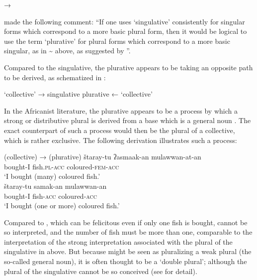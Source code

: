 \begin{exe}
  \ex\label{ex:fassi:17}  → 
\end{exe}

\citet[17, fn. 11]{Corbett2000} made the following comment: ``If one uses
`singulative' consistently for singular forms which correspond to a more basic
plural form, then it would be logical to use the term `plurative' for plural
forms which correspond to a more basic singular, as in 
\textasciitilde\xspace {} above, as suggested by
\citet[224]{Dimmendaal1983}''.

Compared to the singulative, the plurative appears to be taking an opposite
path to be derived, as schematized in :

\begin{exe}
  \ex\label{ex:fassi:18}
  \begin{xlist}
    \ex\label{ex:fassi:18a} `collective' → singulative
    \ex\label{ex:fassi:18b} plurative ← `collective'
  \end{xlist}
\end{exe}

In the Africanist literature, the plurative appears to be a process by which a
strong or distributive plural is derived from a base which is a general noun
\citep[see][]{Mous2008}. The exact  counterpart of such a process would
then be the plural of a collective, which is rather exclusive. The following
derivation illustrates such a process:

\begin{exe}
  \ex\label{ex:fassi:19}
  \begin{xlist}
    \ex\label{ex:fassi:19a}   (collective) →   (plurative)
    \ex\label{ex:fassi:19b}
    \gll \v{s}taray-tu ʔasmaak-an mulawwan-at-an\\
    bought-I fish.\textsc{pl-acc} coloured-\textsc{fem-acc}\\
    \glt `I bought (many) coloured fish.'\\
    \ex\label{ex:fassi:19c}
    \gll \v{s}taray-tu samak-an mulawwan-an\\
    bought-I fish-\textsc{acc} coloured-\textsc{acc}\\
    \glt `I bought (one or more) coloured fish.'\\
  \end{xlist}
\end{exe}

Compared to , which can be felicitous even if only one fish
is bought,  cannot be so interpreted, and the number of fish
must be more than one, comparable to the interpretation of the strong
interpretation associated with the plural of the singulative in
 above. But because  might be seen as
pluralizing a weak plural (the so-called general noun), it is often thought to
be a `double plural'; although the plural of the singulative cannot be so
conceived (see \citealt{FassiFehri2012} for detail).

